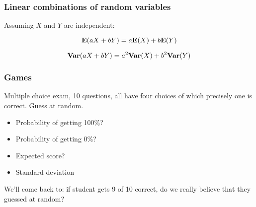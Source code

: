 \begin{frame}
  \frametitle{Linear combinations of random variables}

  Assuming $X$ and $Y$ are independent:
  
  \begin{displaymath}
    \mathbf{E}(aX+bY) = a\mathbf{E}(X) + b\mathbf{E}(Y)
  \end{displaymath}

  \begin{displaymath}
    \mathbf{Var}(aX+bY) = a^2\mathbf{Var}(X) + b^2\mathbf{Var}(Y)
  \end{displaymath}
\end{frame}

\begin{frame}
  \frametitle{Games}

   {
    Multiple choice exam, 10 questions, all have four choices of which
    precisely one is correct.  Guess at random.
    \begin{itemize}
    \item Probability of getting 100\%? 
    \item Probability of getting 0\%? 
    \item Expected score? 
    \item Standard deviation 
    \end{itemize}
    We'll come back to: if student gets 9 of 10 correct, do we really
    believe that they guessed at random?
  }

\end{frame}

